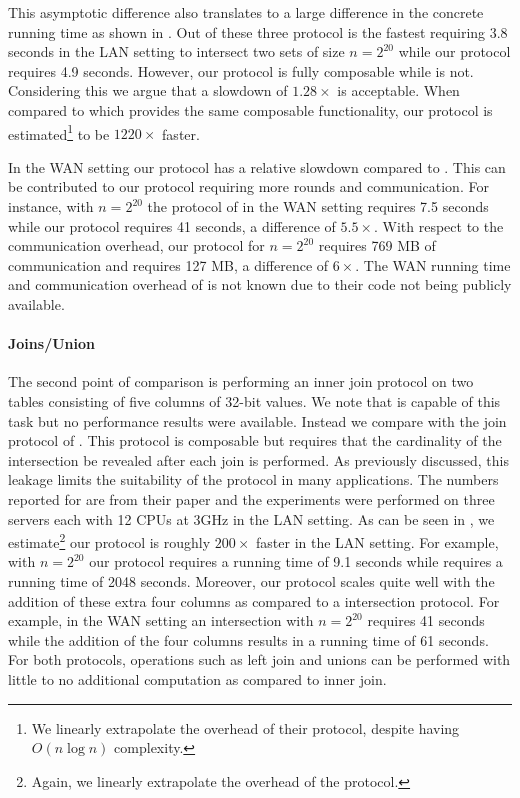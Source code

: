 This asymptotic difference also translates to a large difference in the concrete running time as shown in . Out of these three protocol \cite{CCS:KKRT16} is the fastest requiring 3.8 seconds in the LAN setting to intersect two sets of size $n=2^{20}$ while our protocol requires 4.9 seconds. However, our protocol is fully composable while \cite{CCS:KKRT16} is not. Considering this we argue that a slowdown of $1.28\times$ is acceptable. When compared to \cite{ASIACCS:BlaAgu12} which provides the same composable functionality, our protocol is estimated\footnote{We linearly extrapolate the overhead of their protocol, despite having $O(n\log n)$ complexity.} to be $1220\times$ faster.

In the WAN setting our protocol has a relative slowdown compared to \cite{CCS:KKRT16}. This can be contributed to our protocol requiring more rounds and communication. For instance, with $n=2^{20}$ the protocol of \cite{CCS:KKRT16} in the WAN setting requires 7.5 seconds while our protocol requires 41 seconds, a difference of $5.5\times$. With respect to the communication overhead, our protocol for $n=2^{20}$ requires 769 MB of communication and \cite{CCS:KKRT16} requires 127 MB, a difference of $6\times$. The WAN running time and communication overhead of \cite{ASIACCS:BlaAgu12} is not known due to their code not being publicly available.


\paragraph{Joins/Union} 
The second point of comparison is performing an inner join protocol on two tables consisting of five columns of 32-bit values. We note that \cite{ASIACCS:BlaAgu12} is capable of this task but no performance results were available. Instead we compare with the join protocol of \cite{LTW13}. This protocol is composable but requires that the cardinality of the intersection be revealed after each join is performed. As previously discussed, this leakage limits the suitability of the protocol in many applications. The numbers reported for \cite{LTW13} are from their paper and the experiments were performed on three servers each with 12 CPUs at 3GHz in the LAN setting. As can be seen in , we estimate\footnote{Again, we linearly extrapolate the overhead of the protocol.} our protocol is roughly $200\times$ faster in the LAN setting. For example, with $n=2^{20}$ our protocol requires a running time of 9.1 seconds while \cite{LTW13} requires a running time of 2048 seconds. Moreover, our protocol scales quite well with the addition of these extra four columns as compared to a intersection protocol. For example, in the WAN setting an intersection with $n=2^{20}$ requires 41 seconds while the addition of the four columns results in a  running time of 61 seconds. For both protocols, operations such as left join and unions can be performed with little to no additional computation as compared to inner join.

